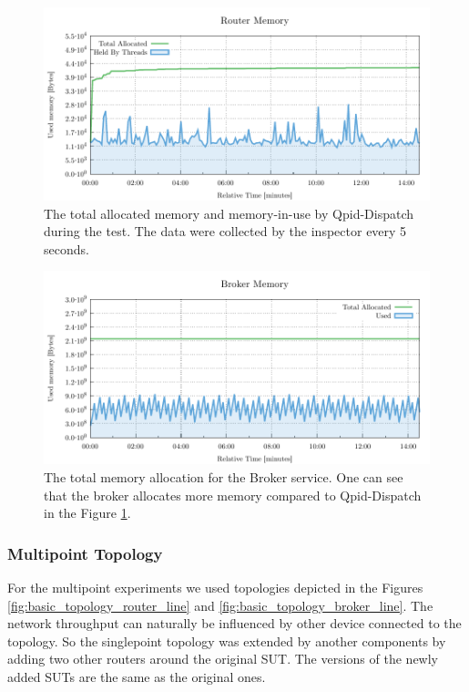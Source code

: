 \begin{figure}[H]
	\centering
	\includegraphics[width=1\linewidth]{obrazky-figures/charts/singlepoint-router-throughput-memory.pdf}
	\caption{The total allocated memory and memory-in-use by Qpid-Dispatch during the test. The data were collected by the inspector every 5\,seconds.}
	\label{fig:router-single-memory}
\end{figure}

\begin{figure}[H]
	\centering
	\includegraphics[width=1\linewidth]{obrazky-figures/charts/singlepoint-broker-throughput-memory.pdf}
	\caption{The total memory allocation for the Broker service. One can see that the broker allocates more memory compared to Qpid-Dispatch in the Figure \ref{fig:router-single-memory}.}
	\label{fig:broker-single-memory}
\end{figure}


\subsubsection*{Multipoint Topology}
For the multipoint experiments we used topologies depicted in the Figures \ref{fig:basic_topology_router_line} and \ref{fig:basic_topology_broker_line}. The network throughput can naturally be influenced by other device connected to the topology. So the singlepoint topology was extended by another components by adding two other routers around the original SUT. The versions of the newly added SUTs are the same as the original ones.

